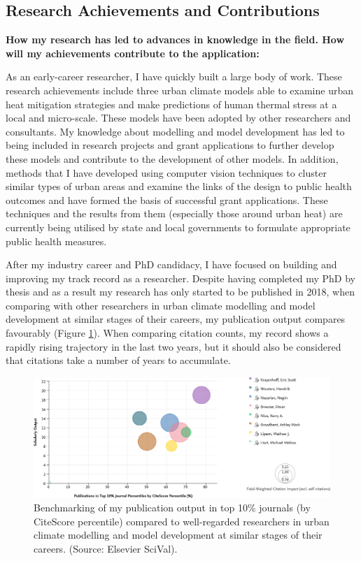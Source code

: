 \subsection*{\TitleFont Research Achievements and Contributions}

\textbf{How my research has led to advances in knowledge in the field. How will my achievements contribute to the application:}


As an early-career researcher, I have quickly built a large body of work. These research achievements include three urban climate models able to examine urban heat mitigation strategies and make predictions of human thermal stress at a local and micro-scale. These models have been adopted by other researchers and consultants. My knowledge about modelling and model development has led to being included in research projects and grant applications to further develop these models and contribute to the development of other models. In addition, methods that I have developed using computer vision techniques to cluster similar types of urban areas and examine the links of the design to public health outcomes and have formed the basis of successful grant applications. These techniques and the results from them (especially those around urban heat) are currently being utilised by state and local governments to formulate appropriate public health measures.

After my industry career and PhD candidacy, I have focused on building and improving my track record as a researcher. Despite having completed my PhD by thesis and as a result my research has only started to be published in 2018, when comparing with other researchers in urban climate modelling and model development at similar stages of their careers, my publication output compares favourably (Figure \ref{fig:benchmark}). When comparing citation counts, my record shows a rapidly rising trajectory in the last two years, but it should also be considered that citations take a number of years to accumulate.



\begin{figure}[ht]
\centering
\includegraphics[scale=0.23]{BenchmarkPublications-crop}
\caption{Benchmarking of my publication output in top 10\% journals (by CiteScore percentile) compared to well-regarded researchers in urban climate modelling and model development at similar stages of their careers. (Source: Elsevier SciVal).}
\label{fig:benchmark}
\end{figure}


